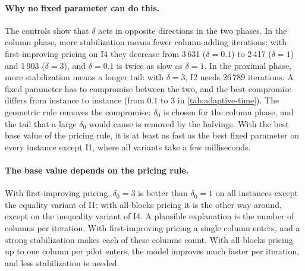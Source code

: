 \paragraph{Why no fixed parameter can do this.} The controls show that $\delta$ acts in
opposite directions in the two phases. In the column phase, more stabilization means fewer
column-adding iterations: with first-improving pricing on I4 they decrease from 3\,631
($\delta = 0.1$) to 2\,417 ($\delta = 1$) and 1\,903 ($\delta = 3$), and $\delta = 0.1$
is twice as slow as $\delta = 1$. In the proximal phase, more stabilization means a longer
tail: with $\delta = 3$, I2 needs 26\,789 iterations. A fixed parameter has to compromise
between the two, and the best compromise differs from instance to instance (from $0.1$ to
$3$ in \cref{tab:adaptive-time}). The geometric rule removes the compromise: $\delta_0$ is
chosen for the column phase, and the tail that a large $\delta_0$ would cause is removed by
the halvings. With the best base value of the pricing rule, it is at least as fast as the
best fixed parameter on every instance except I1, where all variants take a few
milliseconds.

\paragraph{The base value depends on the pricing rule.} With first-improving pricing,
$\delta_0 = 3$ is better than $\delta_0 = 1$ on all instances except the equality variant of
I1; with all-blocks pricing it is the other way around, except on the inequality variant of
I4. A plausible
explanation is the number of columns per iteration. With first-improving pricing a single
column enters, and a strong stabilization makes each of these columns count. With all-blocks
pricing up to one column per pilot enters, the model improves much faster per iteration, and
less stabilization is needed.

\begin{table}[ht]
\centering
\small
\renewcommand{\arraystretch}{1.15}
\setlength{\tabcolsep}{3.5pt}
\caption{Accuracy of the final solution: relative cost error $|c^\top\lambda - z^\star|/|z^\star|$
and infeasibility of the linking rows.}
\label{tab:adaptive-acc}
\end{table}

